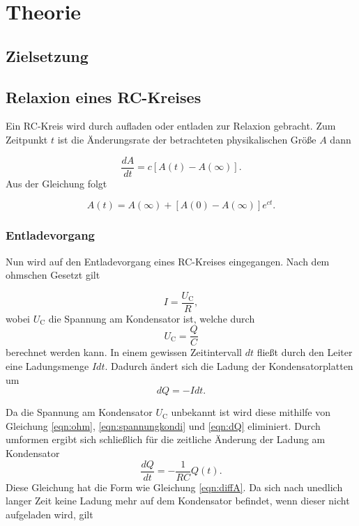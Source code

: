 \section{Theorie}
\label{sec:Theorie}


\subsection{Zielsetzung}

\subsection{Relaxion eines RC-Kreises}
Ein RC-Kreis wird durch aufladen oder entladen zur Relaxion gebracht.
Zum Zeitpunkt $t$ ist die Änderungsrate der betrachteten physikalischen Größe $A$ dann

\begin{equation}
    \frac{dA}{dt} = c \left[ A(t) - A(\infty)  \right]  .
    \label{eqn:diffA}
\end{equation}
Aus der Gleichung folgt 

\begin{equation}
    A(t) = A(\infty) + \left[ A(0) - A(\infty)  \right] e^{ct} .
\end{equation}

\subsubsection{Entladevorgang}

Nun wird auf den Entladevorgang eines RC-Kreises eingegangen.
Nach dem ohmschen Gesetzt gilt 

\begin{equation}
    I = \frac{U_\text{C}}{R}, 
    \label{eqn:ohm}
\end{equation}
wobei $U_\text{C}$ die Spannung am Kondensator ist, welche durch
\begin{equation}
    U_\text{C} = \frac{Q}{C}
    \label{eqn:spannungkondi}
\end{equation}
berechnet werden kann.
In einem gewissen Zeitintervall $dt$ fließt durch den Leiter eine Ladungsmenge $Idt$.
Dadurch ändert sich die Ladung der Kondensatorplatten um
\begin{equation}
    dQ = -Idt.
    \label{eqn:dQ}
\end{equation}

Da die Spannung am Kondensator $U_\text{C}$ unbekannt ist wird diese mithilfe von Gleichung \eqref{eqn:ohm}, \eqref{eqn:spannungkondi} und \eqref{eqn:dQ} eliminiert.
Durch umformen ergibt sich schließlich für die zeitliche Änderung der Ladung am Kondensator 
\begin{equation*}
    \frac{dQ}{dt} = - \frac{1}{RC} Q(t).
\end{equation*}
Diese Gleichung hat die Form wie Gleichung \eqref{eqn:diffA}.
Da sich nach unedlich langer Zeit keine Ladung mehr auf dem Kondensator befindet, wenn dieser nicht aufgeladen wird, gilt 


